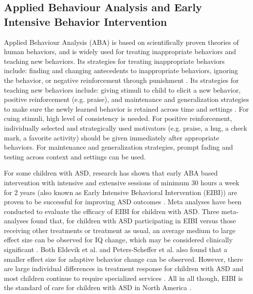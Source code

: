 \documentclass{ut-thesis}
\begin{document}
\subsection{Applied Behaviour Analysis and Early Intensive Behavior Intervention}
Applied Behaviour Analysis (ABA) is based on scientifically proven theories of human behaviors, and is widely used for treating inappropriate behaviors and teaching new behaviors.  Its strategies for treating inappropriate behaviors include: finding and changing antecedents to inappropriate behaviors, ignoring the behavior, or negative reinforcement through punishment \cite{foxx1982decreasing}.  Its strategies for teaching new behaviors include: giving stimuli to child to elicit a new behavior, positive reinforcement (e.g. praise), and maintenance and generalization strategies to make sure the newly learned behavior is retained across time and settings \cite{foxx1982decreasing}.  For cuing stimuli, high level of consistency is needed.  For positive reinforcement, individually selected and strategically used motivators (e.g. praise, a hug, a check mark, a favorite activity) should be given immediately after appropriate behaviors.  For maintenance and generalization strategies, prompt fading and testing across context and settings can be used.


For some children with ASD, research has shown that early ABA based intervention with intensive and extensive sessions of minimum 30 hours a week for 2 years (also known as Early Intensive Behavioral Intervention (EIBI)) are proven to be successful for improving ASD outcomes \cite{howlin2009systematic}.  Meta analyses have been conducted to evaluate the efficacy of EIBI for children with ASD.  Three meta-analyses \cite{eldevik2009meta, reichow2009comprehensive, peters2011meta} found that, for children with ASD participating in EIBI versus those receiving other treatments or treatment as usual, an average medium to large effect size can be observed for IQ change, which may be considered clinically significant \cite{hojat2004visitor}.  Both Eldevik et al. \cite{eldevik2009meta} and Peters-Scheffer et al. \cite{peters2011meta} also found that a smaller effect size for adaptive behavior change can be observed.  However, there are large individual differences in treatment response for children with ASD and most children continue to require specialized services \cite{thill2012robot}.  All in all though, EIBI is the standard of care for children with ASD in North America \cite{keenan2014autism}.
\end{document}
